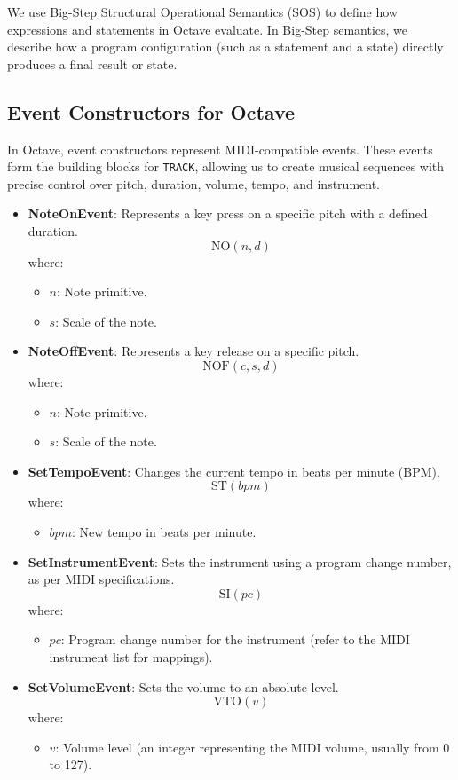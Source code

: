 \documentclass[letterpaper,12pt]{article}
\begin{document}
We use Big-Step Structural Operational Semantics (SOS) to define how expressions 
and statements in Octave evaluate. In Big-Step semantics, we describe how a program configuration (such as a statement and a state) directly produces a final result or state. 

\subsection{Event Constructors for Octave} \label{event constructor}

In Octave, event constructors represent MIDI-compatible events. These events form the building blocks for \texttt{TRACK}, allowing us to create musical sequences with precise control over pitch, duration, volume, tempo, and instrument.

\begin{itemize}
    \item \textbf{NoteOnEvent}: Represents a key press on a specific pitch with a defined duration.
    \[
    \text{NO}(n, d)
    \]
    where:
    \begin{itemize}
        \item \( n \): Note primitive.
        \item \( s \): Scale of the note.
    \end{itemize}

    \item \textbf{NoteOffEvent}: Represents a key release on a specific pitch.
    \[
    \text{NOF}(c, s, d)
    \]
    where:
    \begin{itemize}
        \item \( n \): Note primitive.
        \item \( s \): Scale of the note.
    \end{itemize}

    \item \textbf{SetTempoEvent}: Changes the current tempo in beats per minute (BPM).
    \[
    \text{ST}(bpm)
    \]
    where:
    \begin{itemize}
        \item \( bpm \): New tempo in beats per minute.
    \end{itemize}

    \item \textbf{SetInstrumentEvent}: Sets the instrument using a program change number, as per MIDI specifications.
    \[
    \text{SI}(pc)
    \]
    where:
    \begin{itemize}
        \item \( pc \): Program change number for the instrument (refer to the MIDI instrument list for mappings).
    \end{itemize}

    \item \textbf{SetVolumeEvent}: Sets the volume to an absolute level.
    \[
    \text{VTO}(v)
    \]
    where:
    \begin{itemize}
        \item \( v \): Volume level (an integer representing the MIDI volume, usually from 0 to 127).
    \end{itemize}

\end{itemize}
\end{document}
